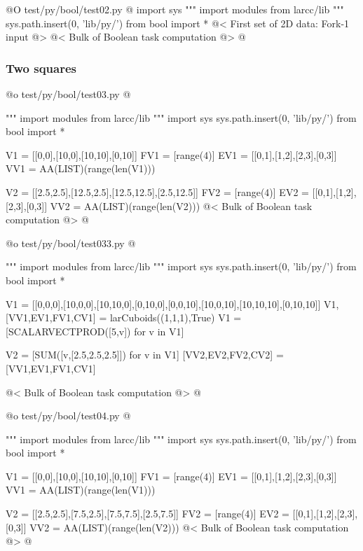 \documentclass[11pt,oneside]{article}	%
\begin{document}
@O test/py/bool/test02.py
@{
import sys
""" import modules from larcc/lib """
sys.path.insert(0, 'lib/py/')
from bool import *
@< First set of 2D data: Fork-1 input @>
@< Bulk of Boolean task computation @>
@}


\subsubsection{Two squares}




@o test/py/bool/test03.py
@{""" import modules from larcc/lib """
import sys
sys.path.insert(0, 'lib/py/')
from bool import *

V1 = [[0,0],[10,0],[10,10],[0,10]]
FV1 = [range(4)]
EV1 = [[0,1],[1,2],[2,3],[0,3]]
VV1 = AA(LIST)(range(len(V1)))

V2 = [[2.5,2.5],[12.5,2.5],[12.5,12.5],[2.5,12.5]]
FV2 = [range(4)]
EV2 = [[0,1],[1,2],[2,3],[0,3]]
VV2 = AA(LIST)(range(len(V2)))
@< Bulk of Boolean task computation @>
@}

@o test/py/bool/test033.py
@{""" import modules from larcc/lib """
import sys
sys.path.insert(0, 'lib/py/')
from bool import *

V1 = [[0,0,0],[10,0,0],[10,10,0],[0,10,0],[0,0,10],[10,0,10],[10,10,10],[0,10,10]]
V1,[VV1,EV1,FV1,CV1] = larCuboids((1,1,1),True)
V1 = [SCALARVECTPROD([5,v]) for v in V1]

V2 = [SUM([v,[2.5,2.5,2.5]]) for v in V1]
[VV2,EV2,FV2,CV2] = [VV1,EV1,FV1,CV1]

@< Bulk of Boolean task computation @>
@}


@o test/py/bool/test04.py
@{""" import modules from larcc/lib """
import sys
sys.path.insert(0, 'lib/py/')
from bool import *

V1 = [[0,0],[10,0],[10,10],[0,10]]
FV1 = [range(4)]
EV1 = [[0,1],[1,2],[2,3],[0,3]]
VV1 = AA(LIST)(range(len(V1)))

V2 = [[2.5,2.5],[7.5,2.5],[7.5,7.5],[2.5,7.5]]
FV2 = [range(4)]
EV2 = [[0,1],[1,2],[2,3],[0,3]]
VV2 = AA(LIST)(range(len(V2)))
@< Bulk of Boolean task computation @>
@}
\end{document}
